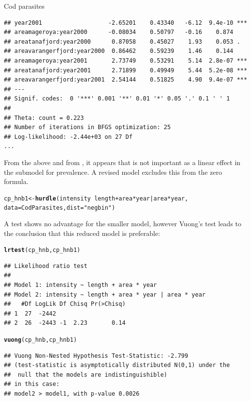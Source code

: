 \documentclass[11pt]{book}\usepackage[]{graphicx}\usepackage[]{color}
\makeatletter
\newcommand{\hlstr}[1]{\textcolor[rgb]{0.192,0.494,0.8}{#1}}%
\newcommand{\hlopt}[1]{\textcolor[rgb]{0,0,0}{#1}}%
\newcommand{\hlstd}[1]{\textcolor[rgb]{0.345,0.345,0.345}{#1}}%
\newcommand{\hlkwb}[1]{\textcolor[rgb]{0.69,0.353,0.396}{#1}}%
\newcommand{\hlkwc}[1]{\textcolor[rgb]{0.333,0.667,0.333}{#1}}%
\newcommand{\hlkwd}[1]{\textcolor[rgb]{0.737,0.353,0.396}{\textbf{#1}}}%
\newenvironment{kframe}{%
 \def\at@end@of@kframe{}%
 \ifinner\ifhmode%
  \def\at@end@of@kframe{\end{minipage}}%
  \begin{minipage}{\columnwidth}%
 \fi\fi%
 \def\FrameCommand##1{\hskip\@totalleftmargin \hskip-\fboxsep
 \colorbox{shadecolor}{##1}\hskip-\fboxsep
     \hskip-\linewidth \hskip-\@totalleftmargin \hskip\columnwidth}%
 \MakeFramed {\advance\hsize-\width
   \@totalleftmargin\z@ \linewidth\hsize
   \@setminipage}}%
 {\par\unskip\endMakeFramed%
 \at@end@of@kframe}
\newenvironment{knitrout}{}{} %
\renewenvironment{knitrout}{\small\renewcommand{\baselinestretch}{.85}}{} %
\makeatother
\begin{document}
\begin{Example}[cod2]{Cod parasites}
\begin{knitrout}
\begin{kframe}
\begin{verbatim}
## year2001                   -2.65201    0.43340   -6.12  9.4e-10 ***
## areamageroya:year2000      -0.08034    0.50797   -0.16    0.874    
## areatanafjord:year2000      0.87058    0.45027    1.93    0.053 .  
## areavarangerfjord:year2000  0.86462    0.59239    1.46    0.144    
## areamageroya:year2001       2.73749    0.53291    5.14  2.8e-07 ***
## areatanafjord:year2001      2.71899    0.49949    5.44  5.2e-08 ***
## areavarangerfjord:year2001  2.54144    0.51825    4.90  9.4e-07 ***
## ---
## Signif. codes:  0 '***' 0.001 '**' 0.01 '*' 0.05 '.' 0.1 ' ' 1 
## 
## Theta: count = 0.223
## Number of iterations in BFGS optimization: 25 
## Log-likelihood: -2.44e+03 on 27 Df
...
\end{verbatim}
\end{kframe}
\end{knitrout}
From the above and from , it appears that
 is not important as a linear effect in the submodel for
prevalence.  A revised model excludes this from the zero formula.

\begin{knitrout}
\color{fgcolor}\begin{kframe}
\begin{alltt}
\hlstd{cp_hnb1} \hlkwb{<-} \hlkwd{hurdle}\hlstd{(intensity} \hlopt{~} \hlstd{length} \hlopt{+} \hlstd{area} \hlopt{*} \hlstd{year} \hlopt{|} \hlstd{area}\hlopt{*}\hlstd{year,}
                  \hlkwc{data} \hlstd{= CodParasites,} \hlkwc{dist} \hlstd{=} \hlstr{"negbin"}\hlstd{)}
\end{alltt}
\end{kframe}
\end{knitrout}

A \LR test shows no advantage for the smaller model, however
Vuong's test leads to the conclusion that this reduced model is preferable:
\begin{knitrout}
\color{fgcolor}\begin{kframe}
\begin{alltt}
\hlkwd{lrtest}\hlstd{(cp_hnb, cp_hnb1)}
\end{alltt}
\begin{verbatim}
## Likelihood ratio test
## 
## Model 1: intensity ~ length + area * year
## Model 2: intensity ~ length + area * year | area * year
##   #Df LogLik Df Chisq Pr(>Chisq)
## 1  27  -2442                    
## 2  26  -2443 -1  2.23       0.14
\end{verbatim}
\begin{alltt}
\hlkwd{vuong}\hlstd{(cp_hnb, cp_hnb1)}
\end{alltt}
\begin{verbatim}
## Vuong Non-Nested Hypothesis Test-Statistic: -2.799 
## (test-statistic is asymptotically distributed N(0,1) under the
##  null that the models are indistinguishible)
## in this case:
## model2 > model1, with p-value 0.0026
\end{verbatim}
\end{kframe}
\end{knitrout}



\end{Example}
\end{document}
